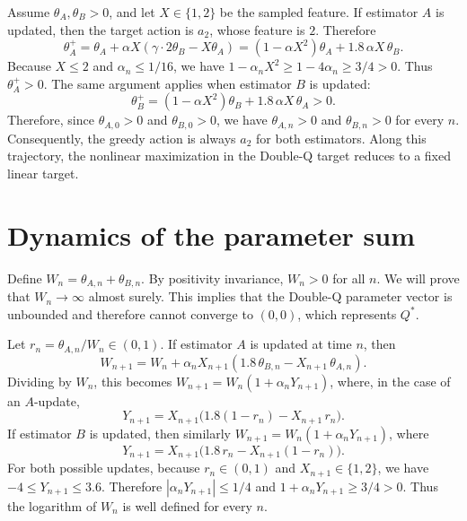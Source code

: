 \documentclass[11pt]{article}
\begin{document}
Assume $\theta_A, \theta_B > 0$, and let $X \in \{1, 2\}$ be the sampled feature. If estimator $A$ is updated, then the target action is $a_2$, whose feature is $2$. Therefore
\begin{equation}\label{eq:update-expanded}
\theta_A^+ = \theta_A + \alpha X(\gamma \cdot 2\theta_B - X\theta_A)
= (1 - \alpha X^2)\theta_A + 1.8\,\alpha X\,\theta_B.
\end{equation}
Because $X \leq 2$ and $\alpha_n \leq 1/16$, we have $1 - \alpha_n X^2 \geq 1 - 4\alpha_n \geq 3/4 > 0$. Thus $\theta_A^+ > 0$. The same argument applies when estimator $B$ is updated:
\begin{equation}
\theta_B^+ = (1 - \alpha X^2)\theta_B + 1.8\,\alpha X\,\theta_A > 0.
\end{equation}
Therefore, since $\theta_{A,0} > 0$ and $\theta_{B,0} > 0$, we have $\theta_{A,n} > 0$ and $\theta_{B,n} > 0$ for every $n$. Consequently, the greedy action is always $a_2$ for both estimators. Along this trajectory, the nonlinear maximization in the Double-Q target reduces to a fixed linear target.

\section{Dynamics of the parameter sum}

Define $W_n = \theta_{A,n} + \theta_{B,n}$. By positivity invariance, $W_n > 0$ for all $n$. We will prove that $W_n \to \infty$ almost surely. This implies that the Double-Q parameter vector is unbounded and therefore cannot converge to $(0,0)$, which represents $Q^*$.

Let $r_n = \theta_{A,n} / W_n \in (0,1)$. If estimator $A$ is updated at time $n$, then
\begin{equation}
W_{n+1} = W_n + \alpha_n X_{n+1}(1.8\,\theta_{B,n} - X_{n+1}\,\theta_{A,n}).
\end{equation}
Dividing by $W_n$, this becomes $W_{n+1} = W_n(1 + \alpha_n Y_{n+1})$, where, in the case of an $A$-update,
\begin{equation}\label{eq:y-a-update}
Y_{n+1} = X_{n+1}\bigl(1.8(1 - r_n) - X_{n+1}\,r_n\bigr).
\end{equation}
If estimator $B$ is updated, then similarly $W_{n+1} = W_n(1 + \alpha_n Y_{n+1})$, where
\begin{equation}\label{eq:y-b-update}
Y_{n+1} = X_{n+1}\bigl(1.8\,r_n - X_{n+1}(1 - r_n)\bigr).
\end{equation}
For both possible updates, because $r_n \in (0,1)$ and $X_{n+1} \in \{1, 2\}$, we have $-4 \leq Y_{n+1} \leq 3.6$. Therefore $|\alpha_n Y_{n+1}| \leq 1/4$ and $1 + \alpha_n Y_{n+1} \geq 3/4 > 0$. Thus the logarithm of $W_n$ is well defined for every $n$.
\end{document}
